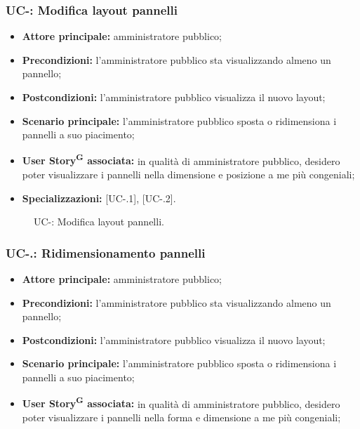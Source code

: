 \documentclass[8pt]{article}
\newcommand{\glossterm}[1]{#1\textsuperscript{G}} %
\begin{document}
\subsubsection*{UC-\ucnumber: Modifica layout pannelli}
\begin{itemize}
    \item \textbf{Attore principale:} amministratore pubblico;
    \item \textbf{Precondizioni:} l'amministratore pubblico sta visualizzando almeno un pannello;
    \item \textbf{Postcondizioni:} l’amministratore pubblico visualizza il nuovo layout;
    \item \textbf{Scenario principale: }l’amministratore pubblico sposta o ridimensiona i pannelli a
        suo piacimento;
    \item \textbf{\glossterm{User Story} associata:} in qualità di amministratore pubblico, desidero poter
        visualizzare i pannelli nella dimensione e posizione a me più congeniali;
    \item \textbf{Specializzazioni:} [UC-\theuc .1], [UC-\theuc .2].
\end{itemize}
\begin{figure}[ht!]
    \centering
    \caption{UC-\theuc: Modifica layout pannelli.}
    \label{fig:UC-\theuc: Modifica layout pannelli}
\end{figure}
\setcounter{specone}{0}
\subsubsection*{UC-\theuc .\speconenumber: Ridimensionamento pannelli}
\begin{itemize}
    \item \textbf{Attore principale:} amministratore pubblico;
    \item \textbf{Precondizioni:} l'amministratore pubblico sta visualizzando almeno un pannello;
    \item \textbf{Postcondizioni:} l’amministratore pubblico visualizza il nuovo layout;
    \item \textbf{Scenario principale: }l’amministratore pubblico sposta o ridimensiona i pannelli a
        suo piacimento;
    \item \textbf{\glossterm{User Story} associata:} in qualità di amministratore pubblico, desidero poter
        visualizzare i pannelli nella forma e dimensione a me più congeniali;
\end{itemize}
\end{document}
